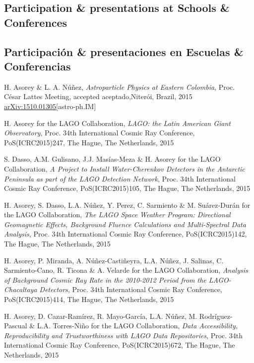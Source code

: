 \ifeng
\subsection*{Participation \& presentations at Schools \& Conferences}
\else
\subsection*{Participación \& presentaciones en Escuelas \& Conferencias}
\fi
\noindent
\begin{etaremune}

\item {}H. Asorey \& L. A. Núñez, {\emph{Astroparticle Physics at Eastern Colombia}}, \en Proc. César Lattes Meeting, \ifeng accepted \else aceptado,\fi Niterói, Brazil, 2015 \href{http://arxiv.org/abs/1510.01305}{arXiv:1510.01305}[astro-ph.IM]

\item {}H. Asorey for the LAGO Collaboration, {\emph{LAGO: the Latin American Giant Observatory}}, \en Proc. 34th International Cosmic Ray Conference, PoS(ICRC2015)247, The Hague, The Netherlands, 2015

\item {}S. Dasso, A.M. Gulisano, J.J. Masías-Meza \& H. Asorey for the LAGO Collaboration, {\emph{A Project to Install Water-Cherenkov Detectors in the Antarctic Peninsula as part of the LAGO Detection Network}}, \en Proc. 34th International Cosmic Ray Conference, PoS(ICRC2015)105, The Hague, The Netherlands, 2015

\item {}H. Asorey, S. Dasso, L.A. Núñez, Y. Perez, C. Sarmiento \& M. Suárez-Durán for the LAGO Collaboration, {\emph{The LAGO Space Weather Program: Directional Geomagnetic Effects, Background Fluence Calculations and Multi-Spectral Data Analysis}}, \en Proc. 34th International Cosmic Ray Conference, PoS(ICRC2015)142, The Hague, The Netherlands, 2015

\item {}H. Asorey, P. Miranda, A. Núñez-Castiñeyra, L.A. Núñez, J. Salinas, C. Sarmiento-Cano, R. Ticona \& A. Velarde for the LAGO Collaboration, {\emph{Analysis of Background Cosmic Ray Rate in the 2010-2012 Period from the LAGO-Chacaltaya Detectors}}, \en Proc. 34th International Cosmic Ray Conference, PoS(ICRC2015)414, The Hague, The Netherlands, 2015

\item {}H. Asorey, D. Cazar-Ramírez, R. Mayo-García, L.A. Núñez, M. Rodríguez-Pascual \& L.A. Torres-Niño for the LAGO Collaboration, {\emph{Data Accessibility, Reproducibility and Trustworthiness with LAGO Data Repositories}}, \en Proc. 34th International Cosmic Ray Conference, PoS(ICRC2015)672, The Hague, The Netherlands, 2015


\end{etaremune}
